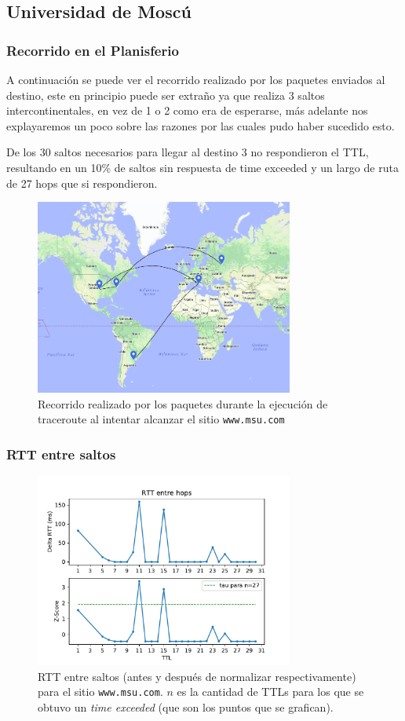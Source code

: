 \subsection*{Universidad de Moscú}

\subsubsection*{Recorrido en el Planisferio}

A continuación se puede ver el recorrido realizado por los paquetes enviados al destino, este en principio puede ser extraño ya que realiza 3 saltos intercontinentales, en vez de 1 o 2 como era de esperarse, más adelante nos explayaremos un poco sobre las razones por las cuales pudo haber sucedido esto.

De los 30 saltos necesarios para llegar al destino 3 no respondieron el TTL, resultando en un 10\% de saltos sin respuesta de time exceeded y un largo de ruta de 27 hops que si respondieron.

\begin{figure}[H]
  \centering
  \includegraphics[width=8.5cm]{figs/moscow.png}
  \caption{\footnotesize Recorrido realizado por los paquetes durante la ejecución de traceroute al intentar alcanzar el sitio \texttt{www.msu.com}}
\end{figure}

\subsubsection*{RTT entre saltos}

\begin{figure}[H]
  \centering
  \includegraphics[width=8.5cm]{figs/traceroute-moscow.pdf}
  \caption{\footnotesize RTT entre saltos (antes y después de normalizar respectivamente) para el sitio \texttt{www.msu.com}. $n$ es la cantidad de TTLs para los que se obtuvo un \emph{time exceeded} (que son los puntos que se grafican).}
  \label{plot-moscow}
\end{figure}

